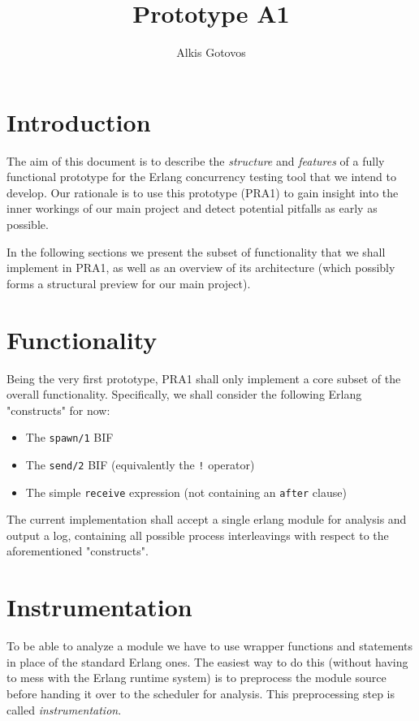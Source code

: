 \documentclass[a4paper,10pt]{article}
\title{Prototype A1}
\author{Alkis Gotovos}
\begin{document}
\lstset{language=Erlang, basicstyle=\small \ttfamily}

\begin{titlepage}
\maketitle
\thispagestyle{empty}
\end{titlepage}

\section{Introduction}
The aim of this document is to describe the \emph{structure} and \emph{features}
of a fully functional prototype for the Erlang concurrency testing tool that we
intend to develop. Our rationale is to use this prototype (PRA1) to gain insight
into the inner workings of our main project and detect potential pitfalls
as early as possible.

In the following sections we present the subset of functionality that we
shall implement in PRA1, as well as an overview of its architecture
(which possibly forms a structural preview for our main project).

\section{Functionality}
Being the very first prototype, PRA1 shall only implement a core subset of the
overall functionality. Specifically, we shall consider the following Erlang
"constructs" for now:
\begin{itemize}
	\item The \lstinline+spawn/1+ BIF
	\item The \lstinline+send/2+ BIF (equivalently the \lstinline+!+ operator)
	\item The simple \lstinline+receive+ expression (not containing an \lstinline+after+ clause)
\end{itemize}

The current implementation shall accept a single erlang module for analysis
and output a log, containing all possible process interleavings
with respect to the aforementioned "constructs".

\section{Instrumentation}
To be able to analyze a module we have to use wrapper functions and statements in place of
the standard Erlang ones. The easiest way to do this (without having to mess with the Erlang runtime system)
is to preprocess the module source before handing it over to the scheduler for analysis. This preprocessing
step is called \emph{instrumentation}.
\end{document}
